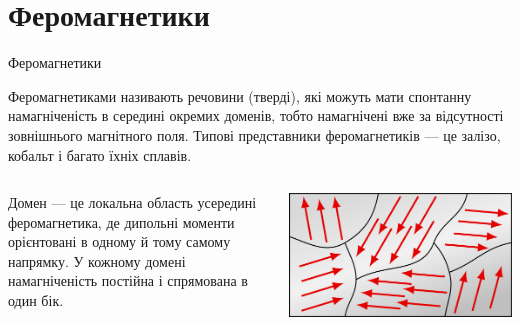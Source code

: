 \documentclass[onlytextwidth]{beamer}
\begin{document}
\section{Феромагнетики}



\begin{frame}{Феромагнетики}{}
	\begin{block}{}
		\alert{Феромагнетиками} називають речовини (тверді), які можуть мати \alert{спонтанну намагніченість в середині окремих доменів}, тобто
		намагнічені вже за відсутності зовнішнього магнітного поля. Типові представники феромагнетиків --- це залізо, кобальт і багато їхніх сплавів.
	\end{block}
	\begin{columns}
		\begin{column}{0.65\linewidth}
			\begin{block}{}\justifying\small
				\alert{Домен} --- це локальна область усередині феромагнетика, де дипольні моменти
				орієнтовані в одному й тому самому напрямку. У кожному домені намагніченість постійна і спрямована
				в один бік.
			\end{block}
		\end{column}
		\begin{column}{0.3\linewidth}\centering
			\includegraphics[width=1\linewidth]{domains}
		\end{column}
	\end{columns}
\end{frame}
\end{document}
